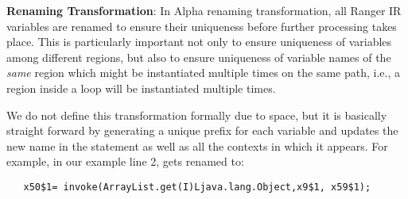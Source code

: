 \textbf{Renaming Transformation}: In Alpha renaming transformation, all Ranger IR variables are renamed to ensure their uniqueness before further processing takes place. 
%
This is particularly important not only to ensure uniqueness of variables among different regions, but also to ensure
uniqueness of variable names of the \textit{same} region which might be instantiated multiple times on the same path,
i.e., a region inside a loop will be instantiated multiple times.

We do not define this transformation formally due to space, but it is basically straight forward by generating a unique prefix for each variable and updates the new name in the statement as well as all the contexts in which it appears.  For example, in our example line 2, gets renamed to:
\begin{lstlisting}
   x50$1= invoke(ArrayList.get(I)Ljava.lang.Object,x9$1, x59$1);
\end{lstlisting}

